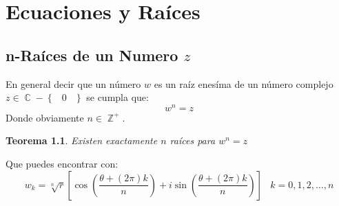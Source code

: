 \documentclass[12pt, fleqn]{report}                             %
\DeclareMathOperator \Space {\quad}                             %
\DeclareMathOperator \MiniSpace {\;}                            %
\newtheorem{Theorem}{Teorema}[section]                          %
\newcommand{\Set}[1]{\left\{ \MiniSpace #1 \MiniSpace \right\}} %
\newcommand{\Brackets}[1]{\left[ #1 \right]}                    %
\newcommand{\Wrap}[1]{\left( #1 \right)}                        %
\DeclareMathOperator \Integers  {\mathbb{Z}}                     %
\DeclareMathOperator \Complexs  {\mathbb{C}}                     %
\newcommand{\Cos}[1]{\cos\Wrap{#1}}
\newcommand{\Sin}[1]{\sin\Wrap{#1}}
\newcommand \Cis[1]  {\Cos{#1} + i \Sin{#1}}                    %
\newcommand \bCis[1] {\Brackets{\Cis{#1}}}                      %
\begin{document}
    \chapter{Ecuaciones y Raíces}


        \clearpage
        \section{n-Raíces de un Numero $z$}

            En general decir que un número $w$ es un raíz enesíma de un número complejo
            $z \in \Complexs - \Set{0}$ se cumpla que:
            \begin{equation*}
                w^n = z
            \end{equation*}
            Donde obviamente $n \in \Integers^+$.


            \begin{Theorem}{Existen exactamente $n$ raíces para $w^n = z$}\end{Theorem}

                Que puedes encontrar con:
                \begin{equation}
                    w_k = \sqrt[n]{r} \bCis{\dfrac{\theta + (2\pi) k}{n}}
                    \MiniSpace k = 0, 1, 2, \dots, n
                \end{equation}
\end{document}
